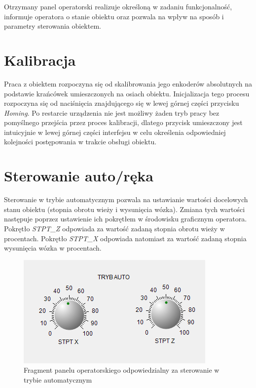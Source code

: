 \documentclass{mwrep}
\begin{document}
Otrzymany panel operatorski realizuje określoną w zadaniu funkcjonalność, informuje operatora o stanie obiektu oraz pozwala na wpływ na sposób i parametry sterowania obiektem.

\section{Kalibracja}
\label{MAPS::Kalibracja}

Praca z obiektem rozpoczyna się od skalibrowania jego enkoderów absolutnych na podstawie krańcówek umieszczonych na osiach obiektu. Inicjalizacja tego procesu rozpoczyna się od naciśnięcia znajdującego się w lewej górnej części przycisku \emph{Homing}. Po restarcie urządzenia nie jest możliwy żaden tryb pracy bez pomyślnego przejścia przez proces kalibracji, dlatego przycisk umieszczony jest intuicyjnie w lewej górnej części interfejsu w celu określenia odpowiedniej kolejności postępowania w trakcie obsługi obiektu.

\section{Sterowanie auto/ręka}
\label{MAPS::AutoReka}

Sterowanie w trybie automatycznym pozwala na ustawianie wartości docelowych stanu obiektu (stopnia obrotu wieży i wysunięcia wózka). Zmiana tych wartości następuje poprzez ustawienie ich pokrętłem w środowisku graficznym operatora.
Pokrętło \emph{STPT\_Z} odpowiada za wartość zadaną stopnia obrotu wieży w procentach. Pokrętło \emph{STPT\_X} odpowiada natomiast za wartość zadaną stopnia wysunięcia wózka w procentach.

\begin{figure}[H]
    \label{MAPS::PanelOperatorski}
    \centering
    \includegraphics[scale=0.8]{auto.png}
    \caption{Fragment panelu operatorskiego odpowiedzialny za sterowanie w trybie automatycznym}
\end{figure}
\end{document}
